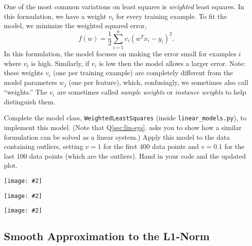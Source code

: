 \documentclass{article}
\newcommand{\blu}[1]{{\textcolor{blu}{#1}}}
\let\ask\blu
\newcommand{\centerfig}[2]{\begin{center}\texttt{[image: \#2]}\end{center}}
\begin{document}
One of the most common variations on least squares is \emph{weighted} least squares. In this formulation, we have a weight $v_i$ for every training example. To fit the model, we minimize the weighted squared error,
\[
f(w) =  \frac{1}{2}\sum_{i=1}^n v_i(w^Tx_i - y_i)^2.
\]
In this formulation, the model focuses on making the error small for examples $i$ where $v_i$ is high. Similarly, if $v_i$ is low then the model allows a larger error. Note: these weights $v_i$ (one per training example) are completely different from the model parameters $w_j$ (one per feature), which, confusingly, we sometimes also call ``weights.'' The $v_i$ are sometimes called \emph{sample weights} or \emph{instance weights} to help distinguish them.

Complete the model class, \texttt{WeightedLeastSquares} (inside \texttt{linear\_models.py}), to implement this model.
(Note that Q\ref{sec:lin-sys}. asks you to show how a similar formulation can be solved as a linear system.)
Apply this model to the data containing outliers, setting $v = 1$ for the first
$400$ data points and $v = 0.1$ for the last $100$ data points (which are the outliers).
\ask{Hand in your code and the updated plot}.
\centerfig{0.7}{q3.1-code1.png}
\centerfig{0.7}{q3.1-code2.png}
\centerfig{0.7}{figs/weighted_least_squares_outliers}


\pagebreak

\subsection{Smooth Approximation to the L1-Norm }\label{sec:huber}
\end{document}
